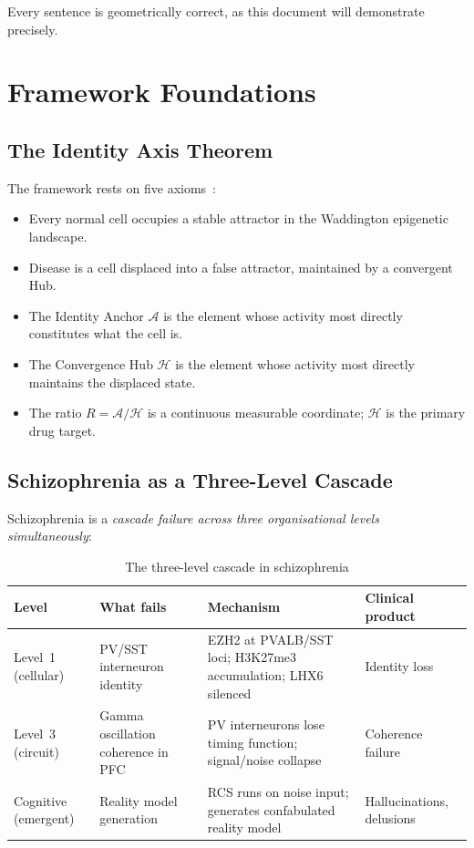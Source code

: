 \documentclass[12pt,a4paper]{article}
\newcommand{\Rratio}{R}
\newcommand{\IA}{\mathcal{A}}
\newcommand{\Hub}{\mathcal{H}}
\begin{document}
Every sentence is geometrically correct, as this document will
demonstrate precisely.

\section{Framework Foundations}

\subsection{The Identity Axis Theorem}

The framework rests on five axioms~\cite{IAT2026}:
\begin{itemize}
  \item Every normal cell occupies a stable attractor in
    the Waddington epigenetic landscape.
  \item Disease is a cell displaced into a false attractor,
    maintained by a convergent Hub.
  \item The Identity Anchor $\IA$ is the element whose
    activity most directly constitutes what the cell is.
  \item The Convergence Hub $\Hub$ is the element whose
    activity most directly maintains the displaced state.
  \item The ratio $\Rratio = \IA/\Hub$ is a continuous
    measurable coordinate; $\Hub$ is the primary drug target.
\end{itemize}

\subsection{Schizophrenia as a Three-Level Cascade}

Schizophrenia is a \emph{cascade failure across three
organisational levels simultaneously}:

\begin{table}[ht!]
\centering
\caption{The three-level cascade in schizophrenia}
\label{tab:levels}
\begin{tabular}{p{1.8cm}p{3.8cm}p{3.8cm}p{3.0cm}}
\toprule
\textbf{Level} &
\textbf{What fails} &
\textbf{Mechanism} &
\textbf{Clinical product} \\
\midrule
Level~1 (cellular) &
PV/SST interneuron
identity &
EZH2 at PVALB/SST loci;
H3K27me3 accumulation;
LHX6 silenced &
Identity loss \\[4pt]
Level~3 (circuit) &
Gamma oscillation
coherence in PFC &
PV interneurons lose
timing function;
signal/noise collapse &
Coherence failure \\[4pt]
Cognitive (emergent) &
Reality model
generation &
RCS runs on noise input;
generates confabulated
reality model &
Hallucinations,
delusions \\
\bottomrule
\end{tabular}
\end{table}
\end{document}
